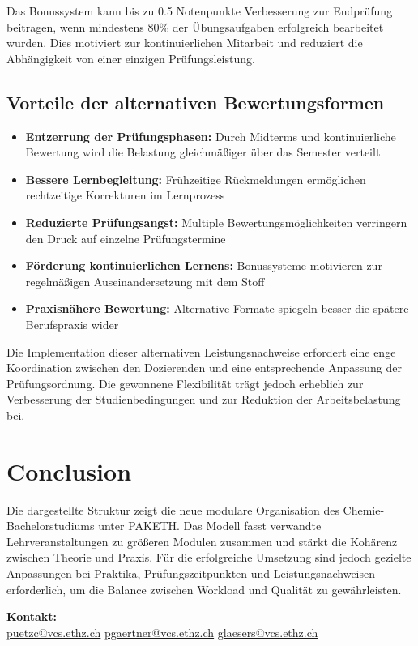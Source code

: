 \documentclass[a4paper]{article}
\begin{document}
Das Bonussystem kann bis zu 0.5 Notenpunkte Verbesserung zur Endprüfung beitragen, wenn mindestens 80\% der Übungsaufgaben erfolgreich bearbeitet wurden. Dies motiviert zur kontinuierlichen Mitarbeit und reduziert die Abhängigkeit von einer einzigen Prüfungsleistung.

\subsection{Vorteile der alternativen Bewertungsformen}

\begin{itemize}
    \item \textbf{Entzerrung der Prüfungsphasen:} Durch Midterms und kontinuierliche Bewertung wird die Belastung gleichmäßiger über das Semester verteilt
    \item \textbf{Bessere Lernbegleitung:} Frühzeitige Rückmeldungen ermöglichen rechtzeitige Korrekturen im Lernprozess
    \item \textbf{Reduzierte Prüfungsangst:} Multiple Bewertungsmöglichkeiten verringern den Druck auf einzelne Prüfungstermine
    \item \textbf{Förderung kontinuierlichen Lernens:} Bonussysteme motivieren zur regelmäßigen Auseinandersetzung mit dem Stoff
    \item \textbf{Praxisnähere Bewertung:} Alternative Formate spiegeln besser die spätere Berufspraxis wider
\end{itemize}

Die Implementation dieser alternativen Leistungsnachweise erfordert eine enge Koordination zwischen den Dozierenden und eine entsprechende Anpassung der Prüfungsordnung. Die gewonnene Flexibilität trägt jedoch erheblich zur Verbesserung der Studienbedingungen und zur Reduktion der Arbeitsbelastung bei.

\section{Conclusion}

Die dargestellte Struktur zeigt die neue modulare Organisation des Chemie-Bachelorstudiums unter PAKETH.  
Das Modell fasst verwandte Lehrveranstaltungen zu größeren Modulen zusammen und stärkt die Kohärenz zwischen Theorie und Praxis.  
Für die erfolgreiche Umsetzung sind jedoch gezielte Anpassungen bei Praktika, Prüfungszeitpunkten und Leistungsnachweisen erforderlich, um die Balance zwischen Workload und Qualität zu gewährleisten.

\vfill
\noindent\textbf{Kontakt:}\\
\href{mailto:puetzc@vcs.ethz.ch}{puetzc@vcs.ethz.ch} \quad
\href{mailto:pgaertner@vcs.ethz.ch}{pgaertner@vcs.ethz.ch} \quad
\href{mailto:glaesers@vcs.ethz.ch}{glaesers@vcs.ethz.ch}
\end{document}
